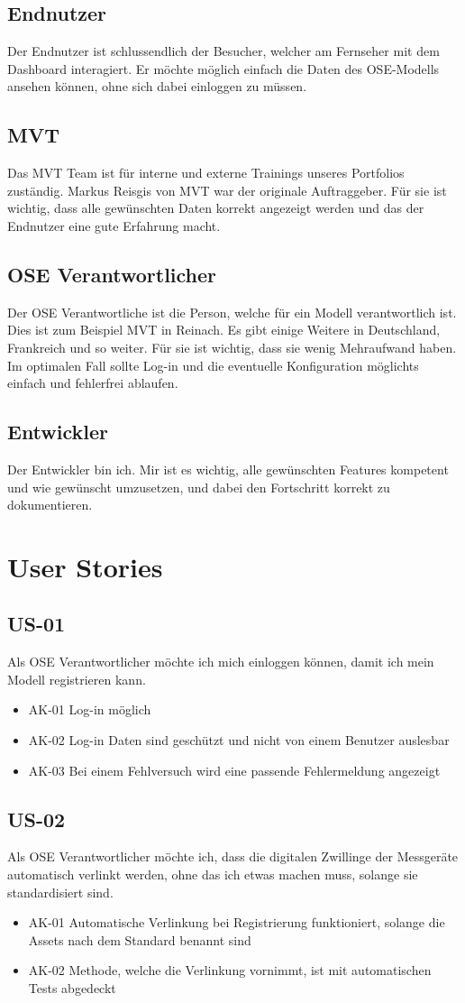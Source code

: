 \subsection{Endnutzer}
Der Endnutzer ist schlussendlich der Besucher, welcher am Fernseher mit dem Dashboard interagiert. Er möchte möglich einfach die Daten des OSE-Modells ansehen können, ohne sich dabei einloggen zu müssen.
\subsection{MVT}
Das MVT Team ist für interne und externe Trainings unseres Portfolios zuständig. Markus Reisgis von MVT war der originale Auftraggeber. Für sie ist wichtig, dass alle gewünschten Daten korrekt angezeigt werden und das der Endnutzer eine gute Erfahrung macht.
\subsection{OSE Verantwortlicher}
Der OSE Verantwortliche ist die Person, welche für ein Modell verantwortlich ist. Dies ist zum Beispiel MVT in Reinach. Es gibt einige Weitere in Deutschland, Frankreich und so weiter. Für sie ist wichtig, dass sie wenig Mehraufwand haben. Im optimalen Fall sollte Log-in und die eventuelle Konfiguration möglichts einfach und fehlerfrei ablaufen.
\subsection{Entwickler}
Der Entwickler bin ich. Mir ist es wichtig, alle gewünschten Features kompetent und wie gewünscht umzusetzen, und dabei den Fortschritt korrekt zu dokumentieren.
\section{User Stories}
\subsection{US-01}
Als OSE Verantwortlicher möchte ich mich einloggen können, damit ich mein Modell registrieren kann.
\begin{itemize}
  \item AK-01 Log-in möglich
  \item AK-02 Log-in Daten sind geschützt und nicht von einem Benutzer auslesbar
  \item AK-03 Bei einem Fehlversuch wird eine passende Fehlermeldung angezeigt
\end{itemize}
\subsection{US-02}
Als OSE Verantwortlicher möchte ich, dass die digitalen Zwillinge der Messgeräte automatisch verlinkt werden, ohne das ich etwas machen muss, solange sie standardisiert sind.
\begin{itemize}
  \item AK-01 Automatische Verlinkung bei Registrierung funktioniert, solange die Assets nach dem Standard benannt sind
  \item AK-02 Methode, welche die Verlinkung vornimmt, ist mit automatischen Tests abgedeckt
\end{itemize}
